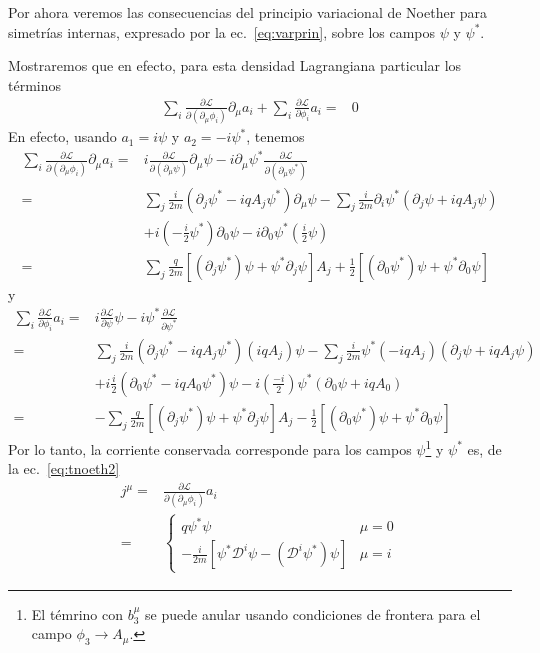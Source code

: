 Por ahora veremos las consecuencias del principio variacional de Noether para simetrías internas, expresado por la ec.~\eqref{eq:varprin}, sobre los campos $\psi$ y $\psi^{*}$.

Mostraremos que en efecto, para esta densidad Lagrangiana particular los términos 
\begin{align*}
\sum_i \frac{\partial\mathcal{L}}{\partial(\partial_{\mu}\phi_i)}\partial_{\mu}a_i+
\sum_i  \frac{\partial\mathcal{L}}{\partial\phi_i}a_i =&0
\end{align*}
En efecto, usando $a_1=i \psi$ y $a_2=-i \psi^*$, tenemos
\begin{align}
\sum_i \frac{\partial\mathcal{L}}{\partial(\partial_{\mu}\phi_i)}\partial_{\mu}a_i=&
i   \frac{\partial\mathcal{L}}{\partial(\partial_{\mu}\psi)} \partial_{\mu}\psi
-i  \partial_{\mu}\psi^*   \frac{\partial\mathcal{L}}{\partial(\partial_{\mu}\psi^*)}\nonumber\\
=&\sum_j \frac{i}{2m} \left(\partial_j\psi^*-iq A_j\psi^* \right) \partial_{\mu}\psi
-\sum_j\frac{i}{2m}\partial_i\psi^* \left(\partial_j\psi+iq A_j\psi \right)\nonumber\\
&+i   \left(-\frac{i}{2}\psi^*\right)      \partial_0\psi 
-i  \partial_0\psi^*     \left(\frac{i}{2}\psi\right) \nonumber\\
=&\sum_j\frac{q}{2m} \left[\left(\partial_j\psi^* \right)\psi+\psi^*\partial_j\psi\right] A_j
+\frac{1}{2}\left[  \left(\partial_0\psi^*\right)\psi+\psi^*\partial_0\psi\right]
\end{align}
y
\begin{align}
\sum_i  \frac{\partial\mathcal{L}}{\partial\phi_i}a_i =&
i \frac{\partial\mathcal{L}}{\partial\psi} \psi
-i \psi^*\frac{\partial\mathcal{L}}{\partial\psi^*}\nonumber\\
=&\sum_j\frac{i}{2m} \left(\partial_j\psi^*-iq A_j\psi^* \right)\left(iqA_j\right)\psi
-\sum_j\frac{i}{2m}\psi^* \left(-iqA_j\right) \left(\partial_j\psi+iq A_j\psi \right)\nonumber\\
&+i  \frac{i}{2}              \left(\partial_0\psi^*-    iqA_0\psi^*\right)        \psi
-i\left(\frac{-i}{2}\right)\psi^*\left(\partial_0\psi+iqA_0\right) \nonumber\\
=&-\sum_j\frac{q}{2m} \left[\left(\partial_j\psi^* \right)\psi+\psi^*\partial_j\psi\right] A_j
-\frac{1}{2}\left[  \left(\partial_0\psi^*\right)\psi+\psi^*\partial_0\psi\right]
\end{align}
Por lo tanto, la corriente conservada corresponde para los campos $\psi$\footnote{El témrino con $b_3^{\mu}$ se puede anular usando condiciones de frontera para el campo $\phi_3\to A_{\mu}$.}
y $\psi^*$  es, de la ec.~\eqref{eq:tnoeth2} 
\begin{align}
j^\mu=&\frac{\partial\mathcal{L}}{\partial(\partial_{\mu}\phi_i)}a_i\nonumber\\
 =&\begin{cases}
q \psi^{*}\psi & \mu=0\\
-\frac{i}{2m} \left[ \psi^{*}\mathcal{D}^i\psi-\left( \mathcal{D}^i\psi^{*} \right)\psi \right] & \mu=i
  \end{cases}
\end{align}


